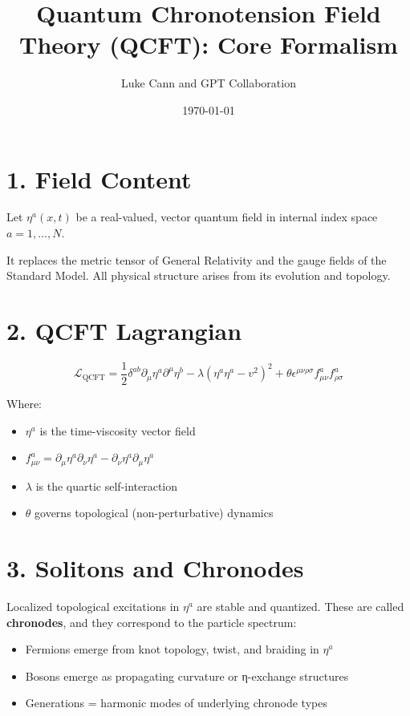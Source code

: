 \documentclass[12pt]{article}
\title{Quantum Chronotension Field Theory (QCFT): Core Formalism}
\author{Luke Cann and GPT Collaboration}
\date{\today}
\begin{document}
\maketitle

\section*{1. Field Content}

Let $\eta^a(x, t)$ be a real-valued, vector quantum field in internal index space $a = 1, \dots, N$.

It replaces the metric tensor of General Relativity and the gauge fields of the Standard Model. All physical structure arises from its evolution and topology.

\section*{2. QCFT Lagrangian}

\begin{equation}
\mathcal{L}_{\text{QCFT}} = \frac{1}{2} \delta^{ab} \partial_\mu \eta^a \partial^\mu \eta^b - \lambda (\eta^a \eta^a - v^2)^2 + \theta \epsilon^{\mu\nu\rho\sigma} f_{\mu\nu}^a f_{\rho\sigma}^a
\end{equation}

Where:
\begin{itemize}
  \item $\eta^a$ is the time-viscosity vector field
  \item $f_{\mu\nu}^a = \partial_\mu \eta^a \partial_\nu \eta^a - \partial_\nu \eta^a \partial_\mu \eta^a$
  \item $\lambda$ is the quartic self-interaction
  \item $\theta$ governs topological (non-perturbative) dynamics
\end{itemize}

\section*{3. Solitons and Chronodes}

Localized topological excitations in $\eta^a$ are stable and quantized. These are called \textbf{chronodes}, and they correspond to the particle spectrum:

\begin{itemize}
  \item Fermions emerge from knot topology, twist, and braiding in $\eta^a$
  \item Bosons emerge as propagating curvature or η-exchange structures
  \item Generations = harmonic modes of underlying chronode types
\end{itemize}
\end{document}
